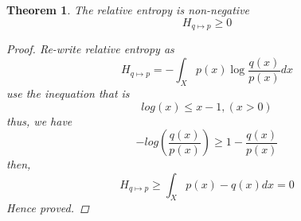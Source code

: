 \documentclass[a4paper]{article}
\newtheorem{theorem}{Theorem}[section]
\begin{document}
\begin{theorem}
    The relative entropy is non-negative
    \begin{equation}
        H_{q \mapsto p} \geqslant 0
    \end{equation}

    \begin{proof}
        Re-write relative entropy as
        \begin{equation*}
            H_{q \mapsto p} = - \int_{X} p(x) \log{\frac{q(x)}{p(x)}} dx
        \end{equation*}
        use the inequation that is
        \begin{equation*}
            log(x) \leqslant x-1, (x > 0)
        \end{equation*}
        thus, we have
        \begin{equation*}
            -log(\frac{q(x)}{p(x)}) \geqslant 1 - \frac{q(x)}{p(x)}
        \end{equation*}
        then,
        \begin{equation*}
            H_{q \mapsto p} \geqslant \int_{X} p(x) - q(x) dx = 0
        \end{equation*}
        Hence proved.
    \end{proof}
\end{theorem}
\end{document}
